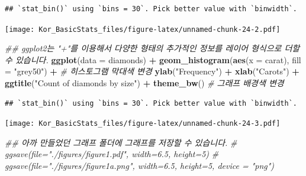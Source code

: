 \documentclass[]{book}
\newenvironment{Shaded}{\begin{snugshade}}{\end{snugshade}}
\newcommand{\CommentTok}[1]{\textcolor[rgb]{0.56,0.35,0.01}{\textit{#1}}}
\newcommand{\DataTypeTok}[1]{\textcolor[rgb]{0.13,0.29,0.53}{#1}}
\newcommand{\KeywordTok}[1]{\textcolor[rgb]{0.13,0.29,0.53}{\textbf{#1}}}
\newcommand{\NormalTok}[1]{#1}
\newcommand{\OperatorTok}[1]{\textcolor[rgb]{0.81,0.36,0.00}{\textbf{#1}}}
\newcommand{\StringTok}[1]{\textcolor[rgb]{0.31,0.60,0.02}{#1}}
\begin{document}
\begin{verbatim}
## `stat_bin()` using `bins = 30`. Pick better value with `binwidth`.
\end{verbatim}

\texttt{[image: Kor\_BasicStats\_files/figure-latex/unnamed-chunk-24-2.pdf]}

\begin{Shaded}
\begin{Highlighting}[]
\CommentTok{## ggplot2는 "+"를 이용해서 다양한 형태의 추가적인 정보를 레이어 형식으로 더할 수 있습니다.}
\KeywordTok{ggplot}\NormalTok{(}\DataTypeTok{data =}\NormalTok{ diamonds) }\OperatorTok{+}\StringTok{ }
\StringTok{  }\KeywordTok{geom_histogram}\NormalTok{(}\KeywordTok{aes}\NormalTok{(}\DataTypeTok{x =}\NormalTok{ carat), }\DataTypeTok{fill =} \StringTok{"grey50"}\NormalTok{) }\OperatorTok{+}\StringTok{ }\CommentTok{# 히스토그램 막대색 변경}
\StringTok{  }\KeywordTok{ylab}\NormalTok{(}\StringTok{"Frequency"}\NormalTok{) }\OperatorTok{+}\StringTok{ }\KeywordTok{xlab}\NormalTok{(}\StringTok{"Carots"}\NormalTok{) }\OperatorTok{+}
\StringTok{  }\KeywordTok{ggtitle}\NormalTok{(}\StringTok{"Count of diamonds by size"}\NormalTok{) }\OperatorTok{+}
\StringTok{  }\KeywordTok{theme_bw}\NormalTok{() }\CommentTok{# 그래프 배경색 변경}
\end{Highlighting}
\end{Shaded}

\begin{verbatim}
## `stat_bin()` using `bins = 30`. Pick better value with `binwidth`.
\end{verbatim}

\texttt{[image: Kor\_BasicStats\_files/figure-latex/unnamed-chunk-24-3.pdf]}

\begin{Shaded}
\begin{Highlighting}[]
\CommentTok{## 아까 만들었던 그래프 폴더에 그래프를 저장할 수 있습니다.}
\CommentTok{# ggsave(file="./figures/figure1.pdf", width=6.5, height=5)}
\CommentTok{# ggsave(file="./figures/figure1a.png", width=6.5, height=5, device = "png")}
\end{Highlighting}
\end{Shaded}
\end{document}
